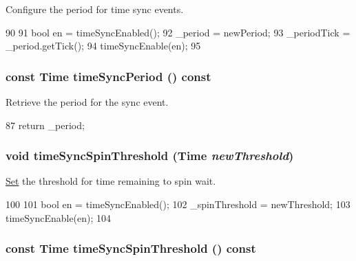 Configure the period for time sync events. 


\begin{DoxyCode}
90 {
91     bool en = timeSyncEnabled();
92     _period = newPeriod;
93     _periodTick = _period.getTick();
94     timeSyncEnable(en);
95 }
\end{DoxyCode}
\hypertarget{classRoot_a830a76b9f0c3aea17ec77cd0e5011ad6}{
\subsubsection[{timeSyncPeriod}]{\setlength{\rightskip}{0pt plus 5cm}const {\bf Time} timeSyncPeriod () const}}
\label{classRoot_a830a76b9f0c3aea17ec77cd0e5011ad6}


Retrieve the period for the sync event. 


\begin{DoxyCode}
87 { return _period; }
\end{DoxyCode}
\hypertarget{classRoot_a2424f9c13e5cf005bc79fbaf431ca660}{
\subsubsection[{timeSyncSpinThreshold}]{\setlength{\rightskip}{0pt plus 5cm}void timeSyncSpinThreshold ({\bf Time} {\em newThreshold})}}
\label{classRoot_a2424f9c13e5cf005bc79fbaf431ca660}


\hyperlink{classSet}{Set} the threshold for time remaining to spin wait. 


\begin{DoxyCode}
100 {
101     bool en = timeSyncEnabled();
102     _spinThreshold = newThreshold;
103     timeSyncEnable(en);
104 }
\end{DoxyCode}
\hypertarget{classRoot_a6528f63bdbdbc8055bbc6b8e34155c31}{
\subsubsection[{timeSyncSpinThreshold}]{\setlength{\rightskip}{0pt plus 5cm}const {\bf Time} timeSyncSpinThreshold () const}}
\label{classRoot_a6528f63bdbdbc8055bbc6b8e34155c31}


